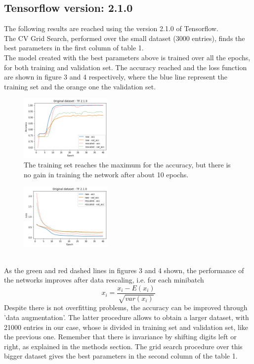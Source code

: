 \documentclass[prl,twocolumn]{revtex4-1}
\begin{document}
\subsection{Tensorflow version:  2.1.0}
The following results are reached using the version 2.1.0 of Tensorflow.\\
The CV Grid Search, performed over the small dataset (3000 entries), finds the best parameters in the first column of table 1.\\
The model created with the best parameters above is trained over all the epochs, for both training and validation set. The accuracy reached and the loss function are shown in figure 3 and 4 respectively, where the blue line represent the training set and the orange one the validation set.
\begin{figure}[h]
	\includegraphics[width=0.40\textwidth]{small_newTF.png}
	\caption{The training set reaches the maximum for the accuracy, but there is no gain in training the network after about 10 epochs.}
	\label{fig:y}
\end{figure}
\begin{figure}[h!!!]
	\includegraphics[width=0.40\textwidth]{small_newTFloss.png}
	\caption{}
	\label{fig:y}
\end{figure}
\\
As the green and red dashed lines in figures 3 and 4 shown, the performance of the networks improves after data rescaling, i.e. for each minibatch
\begin{equation}
x_{i} = \frac{x_{i}-E(x_{i})}{\sqrt{var(x_{i})}} 
\end{equation}
Despite there is not overfitting problems, the accuracy can be improved through 'data augmentation'. The latter procedure allows to obtain a larger dataset, with 21000 entries in our case, whose is divided in training set and validation set, like the previous one. Remember that there is invariance by shifting digits left or right, as explained in the methods section. The grid search procedure over this bigger dataset gives the best parameters in the second column of the table 1.
\end{document}
